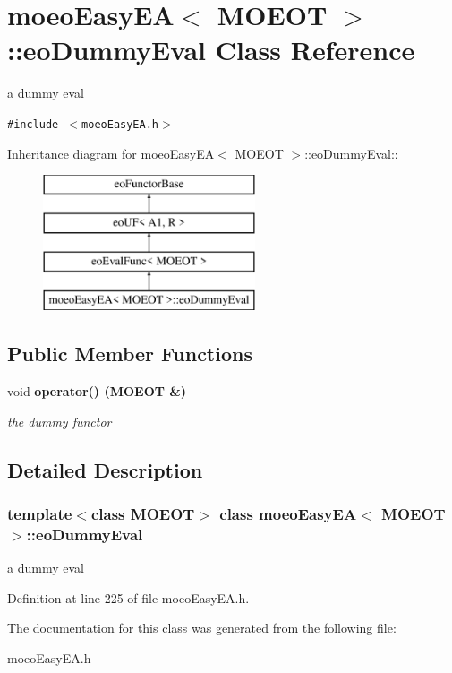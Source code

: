 \section{moeo\-Easy\-EA$<$ MOEOT $>$::eo\-Dummy\-Eval Class Reference}
\label{classmoeoEasyEA_1_1eoDummyEval}
a dummy eval  


{\tt \#include $<$moeo\-Easy\-EA.h$>$}

Inheritance diagram for moeo\-Easy\-EA$<$ MOEOT $>$::eo\-Dummy\-Eval::\begin{figure}[H]
\begin{center}
\leavevmode
\includegraphics[height=4cm]{classmoeoEasyEA_1_1eoDummyEval}
\end{center}
\end{figure}
\subsection*{Public Member Functions}
\begin{CompactItemize}
\item 
void \bf{operator()} (MOEOT \&)\label{classmoeoEasyEA_1_1eoDummyEval_1ed55869451f883db2fc43c60f7caff5}

\begin{CompactList}\small\item\em the dummy functor \item\end{CompactList}\end{CompactItemize}


\subsection{Detailed Description}
\subsubsection*{template$<$class MOEOT$>$ class moeo\-Easy\-EA$<$ MOEOT $>$::eo\-Dummy\-Eval}

a dummy eval 



Definition at line 225 of file moeo\-Easy\-EA.h.

The documentation for this class was generated from the following file:\begin{CompactItemize}
\item 
moeo\-Easy\-EA.h\end{CompactItemize}
